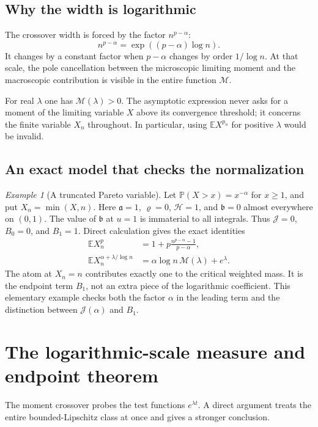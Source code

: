 \documentclass[11pt,a4paper]{article}
\theoremstyle{definition}\newaliascnt{definition}{theorem}
\theoremstyle{remark}\newaliascnt{remark}{theorem}
\newtheorem{example}[example]{Example}
\newcommand{\ljP}{\mathbb P}
\newcommand{\ljE}{\mathbb E}
\begin{document}
\subsection{Why the width is logarithmic}
The crossover width is forced by the factor $n^{p-\alpha}$:
\[
 n^{p-\alpha}=\exp((p-\alpha)\log n).
\]
It changes by a constant factor when $p-\alpha$ changes by order
$1/\log n$. At that scale, the pole cancellation between the microscopic
limiting moment and the macroscopic contribution is visible in the entire
function $\mathcal M$.

For real $\lambda$ one has $\mathcal M(\lambda)>0$. The asymptotic expression
never asks for a moment of the limiting variable $X$ above its convergence
threshold; it concerns the finite variable $X_n$ throughout. In particular,
using $\ljE X^{p_n}$ for positive $\lambda$ would be invalid.

\subsection{An exact model that checks the normalization}
\begin{example}[A truncated Pareto variable]
\label{cjm:ex:pareto}
Let $\ljP(X>x)=x^{-\alpha}$ for $x\ge1$, and put $X_n=\min(X,n)$.
Here $\mathfrak a=1$, $\varrho=0$, $\mathcal H=1$, and $\mathfrak b=0$ almost
everywhere on $(0,1)$. The value of $\mathfrak b$ at $u=1$ is immaterial to
all integrals. Thus $\mathcal J=0$, $B_0=0$, and $B_1=1$. Direct calculation
gives the exact identities
\begin{align}
 \ljE X_n^p&=1+p\frac{n^{p-\alpha}-1}{p-\alpha},\\
 \ljE X_n^{\alpha+\lambda/\log n}&=\alpha\log n\,\mathcal M(\lambda)+e^\lambda.
 \label{cjm:eq:pareto-exact}
\end{align}
The atom at $X_n=n$ contributes exactly one to the critical weighted mass.
It is the endpoint term $B_1$, not an extra piece of the logarithmic
coefficient. This elementary example checks both the factor $\alpha$ in
the leading term and the distinction between $\mathcal J(\alpha)$ and $B_1$.
\end{example}

\section{The logarithmic-scale measure and endpoint theorem}
\label{cjm:sec:measure}
The moment crossover probes the test functions $e^{\lambda t}$. A direct
argument treats the entire bounded-Lipschitz class at once and gives a
stronger conclusion.
\end{document}
